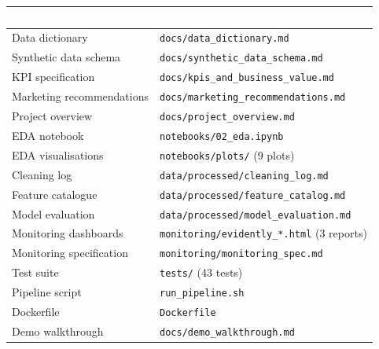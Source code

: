 \documentclass[11pt,a4paper]{article}
\begin{document}
\begin{table}[H]
\centering
\small
{}
\begin{tabularx}{\textwidth}{l X}
\toprule
\rowcolor{tablehead}
\textcolor{white}{\textbf{Deliverable}} & \textcolor{white}{\textbf{Location}} \\
\midrule
Data dictionary              & \texttt{docs/data\_dictionary.md} \\
Synthetic data schema        & \texttt{docs/synthetic\_data\_schema.md} \\
KPI specification            & \texttt{docs/kpis\_and\_business\_value.md} \\
Marketing recommendations    & \texttt{docs/marketing\_recommendations.md} \\
Project overview             & \texttt{docs/project\_overview.md} \\
EDA notebook                 & \texttt{notebooks/02\_eda.ipynb} \\
EDA visualisations           & \texttt{notebooks/plots/} (9 plots) \\
Cleaning log                 & \texttt{data/processed/cleaning\_log.md} \\
Feature catalogue            & \texttt{data/processed/feature\_catalog.md} \\
Model evaluation             & \texttt{data/processed/model\_evaluation.md} \\
Monitoring dashboards        & \texttt{monitoring/evidently\_*.html} (3 reports) \\
Monitoring specification     & \texttt{monitoring/monitoring\_spec.md} \\
Test suite                   & \texttt{tests/} (43 tests) \\
Pipeline script              & \texttt{run\_pipeline.sh} \\
Dockerfile                   & \texttt{Dockerfile} \\
Demo walkthrough             & \texttt{docs/demo\_walkthrough.md} \\
\bottomrule
\end{tabularx}
\end{table}
\end{document}
